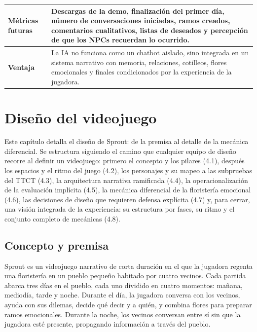 \documentclass[12pt,twoside,titlepage]{report}
\begin{document}
\begin{table}[h]
\begin{footnotesize}
\begin{tabular}{|p{}|p{}|}
\textbf{Métricas futuras} &
Descargas de la demo, finalización del primer día, número de conversaciones iniciadas, ramos creados, comentarios cualitativos, listas de deseados y percepción de que los NPCs recuerdan lo ocurrido. \\
\hline

\textbf{Ventaja} &
La IA no funciona como un chatbot aislado, sino integrada en un sistema narrativo con memoria, relaciones, cotilleos, flores emocionales y finales condicionados por la experiencia de la jugadora. \\
\hline

\end{tabular}
\end{footnotesize}
\end{table}

\chapter{Diseño del videojuego}

Este capítulo detalla el diseño de Sprout: de la premisa al detalle de la mecánica diferencial. Se estructura siguiendo el camino que cualquier equipo de diseño recorre al definir un videojuego: primero el concepto y los pilares (4.1), después los espacios y el ritmo del juego (4.2), los personajes y su mapeo a las subpruebas del TTCT (4.3), la arquitectura narrativa ramificada (4.4), la operacionalización de la evaluación implícita (4.5), la mecánica diferencial de la floristería emocional (4.6), las decisiones de diseño que requieren defensa explícita (4.7) y, para cerrar, una visión integrada de la experiencia: su estructura por fases, su ritmo y el conjunto completo de mecánicas (4.8).

\section{Concepto y premisa}

Sprout es un videojuego narrativo de corta duración en el que la jugadora regenta una floristería en un pueblo pequeño habitado por cuatro vecinos. Cada partida abarca tres días en el pueblo, cada uno dividido en cuatro momentos: mañana, mediodía, tarde y noche. Durante el día, la jugadora conversa con los vecinos, ayuda con sus dilemas, decide qué decir y a quién, y combina flores para preparar ramos emocionales. Durante la noche, los vecinos conversan entre sí sin que la jugadora esté presente, propagando información a través del pueblo.
\end{document}
